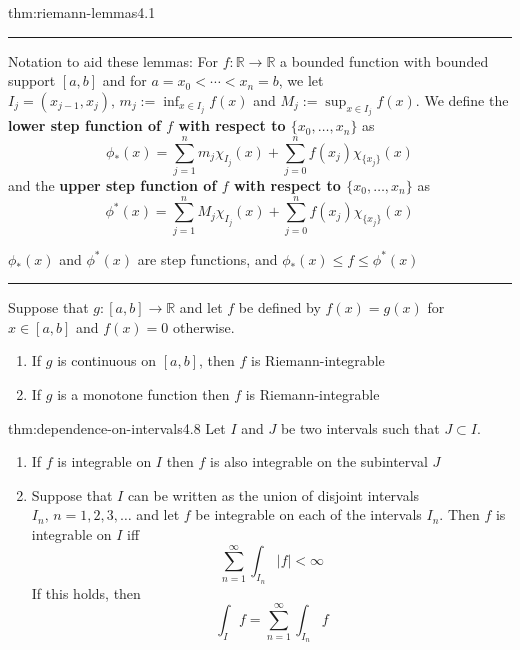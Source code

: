 \documentclass[landscape, 8pt]{extarticle}
\begin{document}
\begin{multicols}{3}
\begin{thm}{thm:riemann-lemmas}{4.1}
	\vspace{-5pt}
	\noindent\rule{\textwidth}{0.2pt}
	Notation to aid these lemmas: For $f : \mathbb{R}\to \mathbb{R}$ a bounded function with bounded support $[a, b]$ and for $a = x_{0} < \cdots < x_{n} = b$, we let $I_{j} = (x_{j - 1}, x_{j}),\, m_{j} := \inf_{x\in I_{j}}f(x)$ and $M_{j} := \sup_{x\in I_{j}} f(x)$. We define the \textbf{lower step function of $f$ with respect to $\{x_{0},\dots,x_{n}\}$} as
	\[\phi_{*}(x) = \sum_{j = 1}^{n} m_{j}\chi_{I_{j}}(x) + \sum_{j = 0}^{n} f(x_{j}) \chi_{\{x_{j}\}}(x)\]
	and the \textbf{upper step function of $f$ with respect to $\{x_{0},\dots,x_{n}\}$} as
	\[\phi^{*}(x) = \sum_{j = 1}^{n} M_{j}\chi_{I_{j}}(x) + \sum_{j = 0}^{n} f(x_{j}) \chi_{\{x_{j}\}}(x)\]

	\vspace{-2pt}
	$\phi_{*}(x)$ and $\phi^{*}(x)$ are step functions, and $\phi_{*}(x) \le f \le \phi^{*}(x)$

	\vspace{-3pt}
	\noindent\rule{\textwidth}{0.2pt}
	Suppose that $g : [a, b] \to \mathbb{R}$ and let $f$ be defined by $f(x) = g(x)$ for $x\in [a,b]$ and $f(x) = 0$ otherwise.
	\vspace{-3pt}
	\begin{enumerate}
	    \setlength\itemsep{0em}
	    \item If $g$ is continuous on $[a, b]$, then $f$ is Riemann-integrable
	    \item If $g$ is a monotone function then $f$ is Riemann-integrable
	\end{enumerate}
\end{thm}




\begin{thm}{thm:dependence-on-intervals}{4.8}
	Let $I$ and $J$ be two intervals such that $J \subset I$.
	\begin{enumerate}
	    \item If $f$ is integrable on $I$ then $f$ is also integrable on the subinterval $J$

			\vspace{-12pt}
		\vspace{-5pt}
		\item Suppose that $I$ can be written as the union of disjoint intervals $I_{n},\, n = 1,2,3,\dots$ and let $f$ be integrable on each of the intervals $I_{n}$. Then $f$ is integrable on $I$ iff
			\[\sum_{n = 1}^{\infty} \int_{I_{n}} \lvert f \rvert < \infty\]
			If this holds, then
			\[\int_{I} f = \sum_{n = 1}^{\infty} \int_{I_{n}} f\]
	\end{enumerate}
\end{thm}



\end{multicols}
\end{document}
